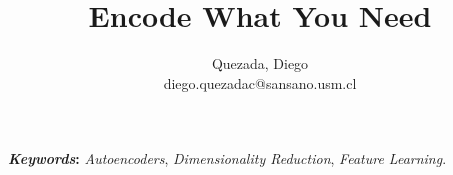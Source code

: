 \documentclass[twocolumn]{article}
\title{\textbf{Encode What You Need}}
\author{Quezada, Diego \\ diego.quezadac@sansano.usm.cl}
\begin{document}
\sloppy %

\maketitle



\textbf{\textit{Keywords}:} \textit{Autoencoders}, \textit{Dimensionality Reduction}, \textit{Feature Learning}.



% 









\newpage


\end{document}
